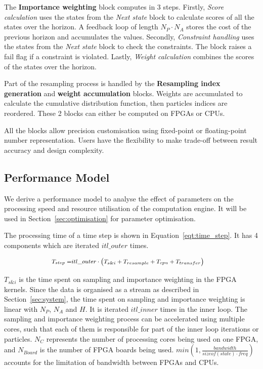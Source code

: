 The \textbf{Importance weighting} block computes in 3 steps.
Firstly, \textit{Score calculation} uses the states from the \emph{Next state} block to calculate scores of all the states over the horizon.
A feedback loop of length $N_P \cdot N_A$ stores the cost of the previous horizon and accumulates the values.
Secondly, \textit{Constraint handling} uses the states from the \emph{Next state} block to check the constraints.
The block raises a fail flag if a constraint is violated.
Lastly, \textit{Weight calculation} combines the scores of the states over the horizon.

Part of the resampling process is handled by the \textbf{Resampling index generation} and \textbf{weight accumulation} blocks.
Weights are accumulated to calculate the cumulative distribution function, then particles indices are reordered.
These 2 blocks can either be computed on FPGAs or CPUs.

All the blocks allow precision customisation using fixed-point or floating-point number representation.
Users have the flexibility to make trade-off between result accuracy and design complexity.


\subsection{Performance Model}
\label{sec:model}

We derive a performance model to analyse the effect of parameters on the processing speed and resource utilisation of the computation engine.
It will be used in Section~\ref{sec:optimisation} for parameter optimisation.

The processing time of a time step is shown in Equation~\ref{eqt:time_step}.
It has 4 components which are iterated $itl\_outer$ times.

\begin{equation}
\footnotesize
\begin{aligned}
T_{step} = & itl\_outer \cdot \left (T_{s\&i} + T_{resample} + T_{cpu} + T_{transfer} \right)
\end{aligned}
\label{eqt:time_step}
\end{equation}
 
$T_{s\&i}$ is the time spent on sampling and importance weighting in the FPGA kernels.
Since the data is organised as a stream as described in Section~\ref{sec:system}, the time spent on sampling and importance weighting is linear with $N_P$, $N_A$ and $H$.
It is iterated $itl\_inner$ times in the inner loop.
The sampling and importance weighting process can be accelerated using multiple cores, such that each of them is responsible for part of the inner loop iterations or particles.
$N_C$ represents the number of processing cores being used on one FPGA, and $N_{Board}$ is the number of FPGA boards being used.
$min(1,\frac{bandwidth}{sizeof(state) \cdot freq})$ accounts for the limitation of bandwidth between FPGAs and CPUs.

